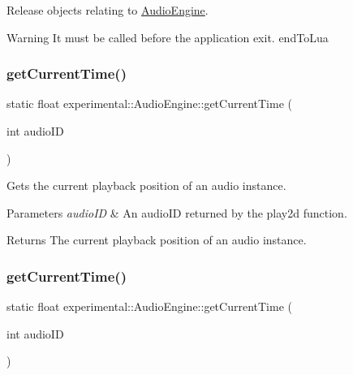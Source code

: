 Release objects relating to \hyperlink{classexperimental_1_1AudioEngine}{Audio\+Engine}.

\begin{DoxyWarning}{Warning}
It must be called before the application exit.  end\+To\+Lua 
\end{DoxyWarning}
\mbox{\label{classexperimental_1_1AudioEngine_a03c38415583bde325e604cc9310d06ad}} 
\subsubsection{\texorpdfstring{get\+Current\+Time()}{getCurrentTime()}\hspace{0.1cm}{\footnotesize\ttfamily [1/2]}}
{\footnotesize\ttfamily static float experimental\+::\+Audio\+Engine\+::get\+Current\+Time (\begin{DoxyParamCaption}\item[{int}]{audio\+ID }\end{DoxyParamCaption})\hspace{0.3cm}{\ttfamily [static]}}

Gets the current playback position of an audio instance.


\begin{DoxyParams}{Parameters}
{\em audio\+ID} & An audio\+ID returned by the play2d function. \\
\hline
\end{DoxyParams}
\begin{DoxyReturn}{Returns}
The current playback position of an audio instance. 
\end{DoxyReturn}
\mbox{\label{classexperimental_1_1AudioEngine_a03c38415583bde325e604cc9310d06ad}} 
\subsubsection{\texorpdfstring{get\+Current\+Time()}{getCurrentTime()}\hspace{0.1cm}{\footnotesize\ttfamily [2/2]}}
{\footnotesize\ttfamily static float experimental\+::\+Audio\+Engine\+::get\+Current\+Time (\begin{DoxyParamCaption}\item[{int}]{audio\+ID }\end{DoxyParamCaption})\hspace{0.3cm}{\ttfamily [static]}}

